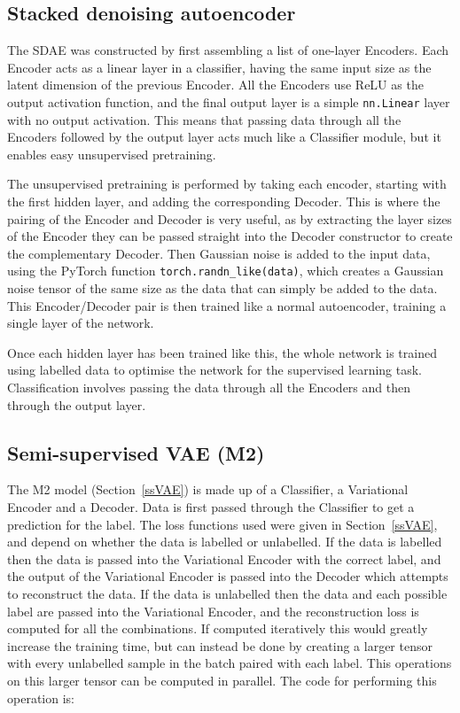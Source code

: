 \subsection{Stacked denoising autoencoder}
The SDAE was constructed by first assembling a list of one-layer Encoders. Each Encoder acts as a linear layer in a classifier,
having the same input size as the latent dimension of the 
previous Encoder. All the Encoders use ReLU as the output activation function, and the final output layer is a simple \texttt{nn.Linear} layer with 
no output activation. This means that passing data through all the Encoders followed by the output layer acts much like 
a Classifier module, but it enables easy unsupervised pretraining.

The unsupervised pretraining is performed by taking each encoder, starting with the first hidden layer, and adding the corresponding 
Decoder. This is where the pairing of the Encoder and Decoder is very useful, as by extracting the layer sizes of the Encoder they 
can be passed straight into the Decoder constructor to create the complementary Decoder. Then Gaussian noise is added to the input data,
using the PyTorch function \texttt{torch.randn\_like(data)}, which creates a Gaussian noise tensor of the same size as the data that can
simply be added to the data. This Encoder/Decoder pair is then trained like a normal autoencoder, training a single layer of the network.

Once each hidden layer has been trained like this, the whole network is trained using labelled data to optimise the network for the 
supervised learning task. Classification involves passing the data through all the Encoders and then through 
the output layer.

\subsection{Semi-supervised VAE (M2)}

The M2 model (Section~\ref{ssVAE}) is made up of a Classifier, a Variational Encoder and a Decoder.
Data is first passed through the Classifier to get a prediction for the label. The loss functions used were given in Section~\ref{ssVAE}, 
and depend on whether the data is labelled or unlabelled. If the data is labelled then the data is passed into the Variational Encoder 
with the correct label, and the output of the Variational Encoder is passed into the Decoder which attempts to reconstruct the data.
If the data is unlabelled then the data and each possible label are passed into the Variational Encoder, and the reconstruction loss 
is computed for all the combinations. If computed iteratively this would greatly increase the training time, but can instead be done 
by creating a larger tensor with every unlabelled sample in the batch paired with each label. This operations on this larger tensor 
can be computed in parallel. The code for performing this 
operation is:

